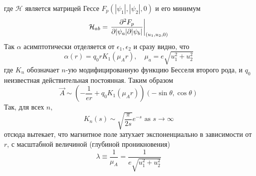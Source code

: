где \( \mathcal{H} \) является матрицей Гессе \( F_p(|\psi_1|, |\psi_2|, 0) \) 
и его минимум
\begin{equation}
    \mathcal{H}_{ab} = \left. \frac{\partial^2 F_p}{\partial |\psi_a| \partial |\psi_b|} 
        \right|_{(u_1, u_2, 0)}
    \label{eq:12}
\end{equation}
Так \( \alpha \) асимптотически отделяется от \( \epsilon_1, \epsilon_2\) и 
сразу видно, что
\begin{equation}
    \alpha(r) = q_0 r K_1(\mu_A r), \quad
    \mu_a = e\sqrt{u_1^2 + u_2^2}
    \label{eq:13}
\end{equation}
где \( K_n \) обозначает \( n \)-ую модифицированную функцию Бесселя второго 
рода, и \( q_0 \) неизвестная действительная постоянная. Таким образом
\begin{equation}
    \vec{A} \sim \left( -\frac{1}{er} + q_0 K_1(\mu_A r) \right)
        (-\sin\theta, \cos\theta)
    \label{eq:14}
\end{equation}
Так, для всех \( n \), 
\begin{equation}
    K_n(s) \sim \sqrt{\frac{\pi}{2s}}e^{-s} \text{ as } s \rightarrow \infty
    \label{eq:15}
\end{equation}
отсюда вытекает, что магнитное поле затухает экспоненциально в зависимости от 
\( r \), с масштабной величиной (глубиной проникновения)
\begin{equation}
    \lambda \equiv \frac{1}{\mu_A} = \frac{1}{e\sqrt{u_1^2 + u_2^2}}
    \label{eq:16}
\end{equation}


